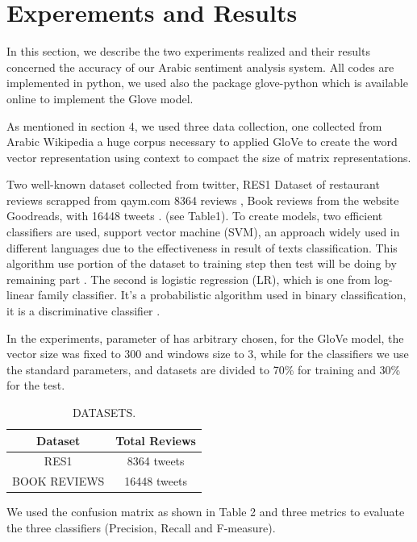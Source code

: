 \documentclass[conference]{IEEEtran}
\begin{document}
	\section{Experements and Results}
	In this section, we describe the two experiments realized and their results concerned the accuracy of our Arabic sentiment analysis system. All codes are implemented in python, we used also the package glove-python which is available online to implement the Glove model. 
	
	As mentioned in section 4, we used three data collection, one collected from Arabic Wikipedia a huge corpus necessary to applied GloVe to create the word vector representation using context to compact the size of matrix representations. 
	
	Two well-known dataset collected from twitter, RES1 Dataset of restaurant reviews scrapped from qaym.com 8364 reviews , Book reviews from the website Goodreads, with 16448 tweets . (see Table1).
	To create models, two efficient classifiers are used, support vector machine (SVM), an approach widely used in different languages due to the effectiveness in result of texts classification. This algorithm use portion of the dataset to training step then test will be doing by remaining part . The second is logistic regression (LR), which is one from log-linear family classifier. It’s a probabilistic algorithm used in binary classification, it is a discriminative classifier .
	
	In the experiments, parameter of has arbitrary chosen, for the GloVe model, the vector size was fixed to 300 and windows size to 3, while for the classifiers we use the standard parameters, and datasets are divided to 70\% for training and 30\% for the test.
	
	\begin{table}[!ht]
		\large        %
		\caption{DATASETS.}\label{label}
		\centering    %
		\begin{tabular}{|c|c|}
			\hline
			Dataset&Total Reviews\\     %
			\hline
			RES1&8364 tweets\\
			\hline
			BOOK REVIEWS&16448 tweets\\
			\hline
			
		\end{tabular}
	\end{table}
	
	We used the confusion matrix as shown in Table 2 and three metrics to evaluate the three classifiers (Precision, Recall and F-measure).
	
\end{document}

